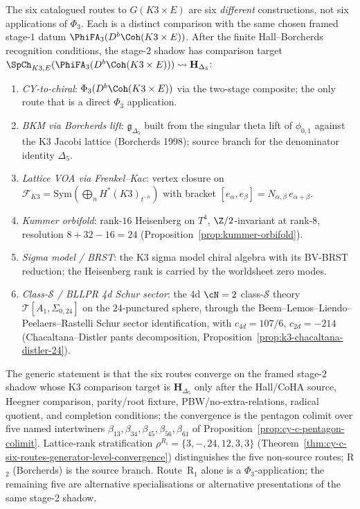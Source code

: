 \begin{remark}
\label{rem:v3-intro-six-routes}
The six catalogued routes to $G(K3\times E)$ are six
\emph{different} constructions, not six applications of
$\Phi_3$. Each is a distinct comparison with the same chosen framed
stage-$1$ datum $\PhiFA_3(D^b\Coh(K3\times E))$. After the finite
Hall--Borcherds recognition conditions, the stage-$2$ shadow has comparison
target
$\SpCh_{K3, E}(\PhiFA_3(D^b\Coh(K3\times E)))
\rightsquigarrow \mathbf{H}_{\Delta_5}$:
\begin{enumerate}[label=\textup{(R\arabic*)},leftmargin=2em,
 topsep=0.2ex,itemsep=0.2ex]
\item \emph{CY-to-chiral}: $\Phi_3(D^b\Coh(K3\times E))$ via
 the two-stage composite; the only route that is a direct
 $\Phi_3$ application.
\item \emph{BKM via Borcherds lift}: $\mathfrak{g}_{\Delta_5}$
 built from the singular theta lift of $\phi_{0,1}$ against
 the K3 Jacobi lattice (Borcherds 1998); source branch for
 the denominator identity $\Delta_5$.
\item \emph{Lattice VOA via Frenkel--Kac}: vertex closure on
 $\mathcal{F}_{K3} = \mathrm{Sym}(\bigoplus_n H^*(K3)_{t^{-n}})$
 with bracket
 $[e_\alpha, e_\beta] = N_{\alpha, \beta}\, e_{\alpha + \beta}$.
\item \emph{Kummer orbifold}: rank-$16$ Heisenberg on $T^4$,
 $\Z/2$-invariant at rank-$8$, resolution $8 + 32 - 16 = 24$
 (Proposition~\ref{prop:kummer-orbifold}).
\item \emph{Sigma model / BRST}: the K3 sigma model chiral
 algebra with its BV-BRST reduction; the Heisenberg rank is
 carried by the worldsheet zero modes.
\item \emph{Class-$\mathcal{S}$ / BLLPR 4d Schur sector}:
 the $4$d $\cN = 2$ class-$\mathcal{S}$ theory
 $\mathcal{T}[A_1, \Sigma_{0, 24}]$ on the $24$-punctured
 sphere, through the Beem--Lemos--Liendo--Peelaers--Rastelli
 Schur sector identification, with
 $c_{4d} = 107/6$, $c_{2d} = -214$
 (Chacaltana--Distler pants decomposition,
 Proposition~\ref{prop:k3-chacaltana-distler-24}).
\end{enumerate}
The generic statement is that the six routes converge on the
framed stage-$2$ shadow whose K3 comparison target is
$\mathbf{H}_{\Delta_5}$ only after the Hall/CoHA source, Heegner
comparison, parity/root fixture, PBW/no-extra-relations, radical
quotient, and completion conditions;
the convergence is the pentagon colimit over five named
intertwiners $\beta_{13}, \beta_{34}, \beta_{45}, \beta_{56},
\beta_{61}$ of
Proposition~\ref{prop:cy-c-pentagon-colimit}. Lattice-rank
stratification $\rho^{R_i} = \{3, -, 24, 12, 3, 3\}$
(Theorem~\ref{thm:cy-c-six-routes-generator-level-convergence})
distinguishes the five non-source routes; R$_2$ (Borcherds) is
the source branch. Route~R$_1$ alone is a $\Phi_3$-application;
the remaining five are alternative specialisations or
alternative presentations of the same stage-2 shadow.
\end{remark}

